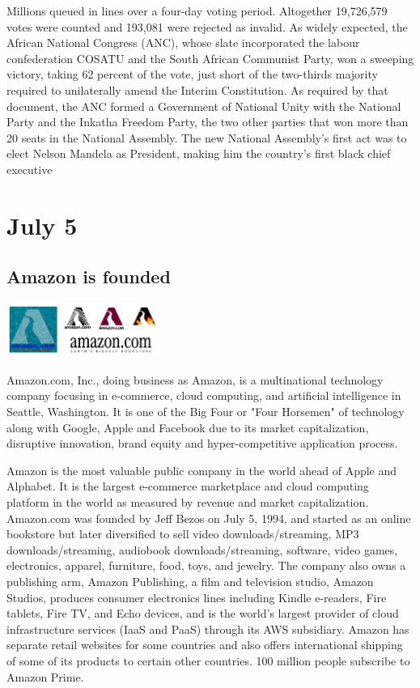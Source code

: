 \documentclass[11pt]{report}
\begin{document}
Millions queued in lines over a four-day voting period. Altogether 19,726,579 votes were counted and 193,081 were rejected as invalid. As widely expected, the African National Congress (ANC), whose slate incorporated the labour confederation COSATU and the South African Communist Party, won a sweeping victory, taking 62 percent of the vote, just short of the two-thirds majority required to unilaterally amend the Interim Constitution. As required by that document, the ANC formed a Government of National Unity with the National Party and the Inkatha Freedom Party, the two other parties that won more than 20 seats in the National Assembly. The new National Assembly's first act was to elect Nelson Mandela as President, making him the country's first black chief executive
\section{July 5}
\subsection{Amazon is founded}
\vspace{2mm}\begin{center}\includegraphics[width=5cm]{./img/amazon.jpg}\end{center}
Amazon.com, Inc., doing business as Amazon, is a multinational technology company focusing in e-commerce, cloud computing, and artificial intelligence in Seattle, Washington. It is one of the Big Four or "Four Horsemen" of technology along with Google, Apple and Facebook due to its market capitalization, disruptive innovation, brand equity and hyper-competitive application process.

Amazon is the most valuable public company in the world ahead of Apple and Alphabet. It is the largest e-commerce marketplace and cloud computing platform in the world as measured by revenue and market capitalization. Amazon.com was founded by Jeff Bezos on July 5, 1994, and started as an online bookstore but later diversified to sell video downloads/streaming, MP3 downloads/streaming, audiobook downloads/streaming, software, video games, electronics, apparel, furniture, food, toys, and jewelry. The company also owns a publishing arm, Amazon Publishing, a film and television studio, Amazon Studios, produces consumer electronics lines including Kindle e-readers, Fire tablets, Fire TV, and Echo devices, and is the world's largest provider of cloud infrastructure services (IaaS and PaaS) through its AWS subsidiary. Amazon has separate retail websites for some countries and also offers international shipping of some of its products to certain other countries. 100 million people subscribe to Amazon Prime.
\end{document}
